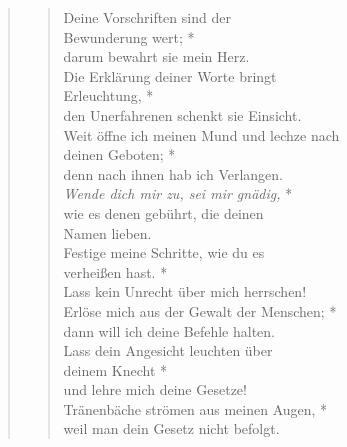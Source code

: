 \begin{quote}
 

\begin{verse}


 Deine Vorschriften sind der \\Bewunderung wert; *\\
darum bewahrt sie mein Herz.\\ \vin
 Die Erklärung deiner Worte bringt \\ \vin Erleuchtung, *\\ \vin
den Unerfahrenen schenkt sie Einsicht.\\
  Weit öffne ich meinen Mund und lechze nach\\ deinen Geboten; *\\ denn nach ihnen hab ich Verlangen.\\ \vin
 \textit{Wende dich mir zu, sei mir gnädig,} *\\ \vin
wie es denen gebührt, die deinen \\ \vin Namen lieben.\\ 
 Festige meine Schritte, wie du es \\ verheißen hast. *\\
Lass kein Unrecht über mich herrschen!\\ \vin
 Erlöse mich aus der Gewalt der Menschen; *\\ \vin
dann will ich deine Befehle halten.\\ 
 Lass dein Angesicht leuchten über\\ deinem Knecht *\\
und lehre mich deine Gesetze!\\  \vin
 Tränenbäche strömen aus meinen Augen, *\\  \vin
weil man dein Gesetz nicht befolgt.\\ 

\vspace{0.4cm}


\end{verse}
\end{quote}
